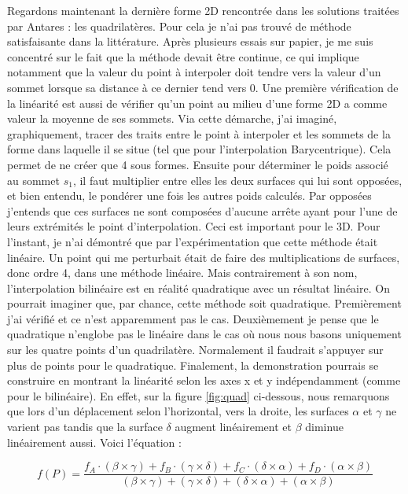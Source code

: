 Regardons maintenant la dernière forme 2D rencontrée dans les solutions traitées par Antares : les quadrilatères.
Pour cela je n'ai pas trouvé de méthode satisfaisante dans la littérature.\cite{perronnet1998} Après plusieurs essais sur papier, je me suis concentré sur le fait que la méthode devait être continue, ce qui implique notamment que la valeur du point à interpoler doit tendre vers la valeur d'un sommet lorsque sa distance à ce dernier tend vers 0.
Une première vérification de la linéarité est aussi de vérifier qu'un point au milieu d'une forme 2D a comme valeur la moyenne de ses sommets.
Via cette démarche, j'ai imaginé, graphiquement, tracer des traits entre le point à interpoler et les sommets de la forme dans laquelle il se situe (tel que pour l'interpolation Barycentrique).
Cela permet de ne créer que 4 sous formes.
Ensuite pour déterminer le poids associé au sommet \( s_1 \), il faut multiplier entre elles les deux surfaces qui lui sont opposées, et bien entendu, le pondérer une fois les autres poids calculés.
Par opposées j'entends que ces surfaces ne sont composées d'aucune arrête ayant pour l'une de leurs extrémités le point d'interpolation. Ceci est important pour le 3D. Pour l'instant, je n'ai démontré que par l'expérimentation que cette méthode était linéaire.
Un point qui me perturbait était de faire des multiplications de surfaces, donc ordre 4, dans une méthode linéaire.
Mais contrairement à son nom, l'interpolation bilinéaire est en réalité quadratique avec un résultat linéaire.
On pourrait imaginer que, par chance, cette méthode soit quadratique.
Premièrement j'ai vérifié et ce n'est apparemment pas le cas.
Deuxièmement je pense que le quadratique n'englobe pas le linéaire dans le cas où nous nous basons uniquement sur les quatre points d'un quadrilatère.
Normalement il faudrait s'appuyer sur plus de points pour le quadratique. 
Finalement, la demonstration pourrais se construire en montrant la linéarité selon les axes x et y indépendamment (comme pour le bilinéaire). En effet, sur la figure \ref{fig:quad} ci-dessous, nous remarquons que lors d'un déplacement selon l'horizontal, vers la droite, les surfaces \(\alpha\) et \(\gamma\) ne varient pas tandis que la surface \(\delta\) augment linéairement et \(\beta\) diminue linéairement aussi.
Voici l'équation :

\begin{equation}
    f(P) = \frac{f_{A} \cdot (\beta \times \gamma) + f_{B} \cdot (\gamma \times \delta) + f_{C} \cdot (\delta \times \alpha) + f_{D} \cdot (\alpha \times \beta)}{(\beta \times \gamma) + (\gamma \times \delta) + (\delta \times \alpha) + (\alpha \times \beta)}
\end{equation}
    

